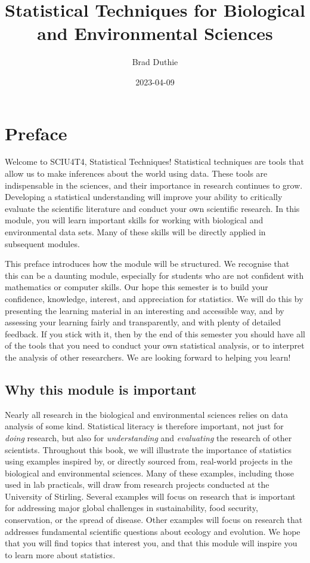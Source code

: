 \documentclass[
]{scrbook}
\title{Statistical Techniques for Biological and Environmental Sciences}
\author{Brad Duthie}
\date{2023-04-09}
\begin{document}
\maketitle

{
\hypersetup{linkcolor=}
\setcounter{tocdepth}{1}
\tableofcontents
}
\hypertarget{preface}{%
\chapter*{Preface}\label{preface}}

Welcome to SCIU4T4, Statistical Techniques!
Statistical techniques are tools that allow us to make inferences about the world using data.
These tools are indispensable in the sciences, and their importance in research continues to grow.
Developing a statistical understanding will improve your ability to critically evaluate the scientific literature and conduct your own scientific research.
In this module, you will learn important skills for working with biological and environmental data sets.
Many of these skills will be directly applied in subsequent modules.

This preface introduces how the module will be structured.
We recognise that this can be a daunting module, especially for students who are not confident with mathematics or computer skills.
Our hope this semester is to build your confidence, knowledge, interest, and appreciation for statistics.
We will do this by presenting the learning material in an interesting and accessible way, and by assessing your learning fairly and transparently, and with plenty of detailed feedback.
If you stick with it, then by the end of this semester you should have all of the tools that you need to conduct your own statistical analysis, or to interpret the analysis of other researchers.
We are looking forward to helping you learn!

\hypertarget{why-this-module-is-important}{%
\section*{Why this module is important}\label{why-this-module-is-important}}

Nearly all research in the biological and environmental sciences relies on data analysis of some kind.
Statistical literacy is therefore important, not just for \emph{doing} research, but also for \emph{understanding} and \emph{evaluating} the research of other scientists.
Throughout this book, we will illustrate the importance of statistics using examples inspired by, or directly sourced from, real-world projects in the biological and environmental sciences.
Many of these examples, including those used in lab practicals, will draw from research projects conducted at the University of Stirling.
Several examples will focus on research that is important for addressing major global challenges in sustainability, food security, conservation, or the spread of disease.
Other examples will focus on research that addresses fundamental scientific questions about ecology and evolution.
We hope that you will find topics that interest you, and that this module will inspire you to learn more about statistics.
\end{document}
